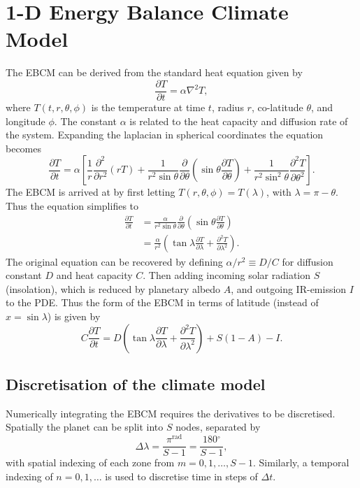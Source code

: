 \documentclass[12pt, onecolumn]{revtex4-2}    %
\newcommand{\radians}{\ensuremath{^{\text{rad}}}}
\newcommand{\degrees}{\ensuremath{^{\circ}}}
\newcommand{\partialderiv}[2]{\frac{\partial {#1}}{\partial {#2}}}
\newcommand{\partialderivsecnd}[2]{\frac{\partial^2 {#1}}{\partial {#2}^2}}
\begin{document}
\section{1-D Energy Balance Climate Model}\label{sec:1DEBCM}
The EBCM can be derived from the standard heat equation given by
\begin{equation}
  \partialderiv{T}{t} = \alpha \nabla^2 T,
\end{equation}
where $T(t, r, \theta, \phi)$ is the temperature at time $t$, radius $r$, co-latitude $\theta$, and longitude $\phi$.
The constant $\alpha$ is related to the heat capacity and diffusion rate of the system.
Expanding the laplacian in spherical coordinates the equation becomes
\begin{equation}
  \partialderiv{T}{t} = \alpha \left[\frac{1}{r} \partialderivsecnd{}{r} (r T)
    + \frac{1}{r^2 \sin\theta} \partialderiv{}{\theta}\left(\sin\theta \partialderiv{T}{\theta}\right)
    + \frac{1}{r^2 \sin^2\theta} \partialderivsecnd{T}{\theta} \right]. \label{eq:FullyExpandedHeatEqn}
\end{equation}
The EBCM is arrived at by first letting $T(r, \theta, \phi) = T(\lambda)$, with $\lambda = \pi - \theta$. Thus the equation simplifies to
\begin{align}
  \partialderiv{T}{t} & = \frac{\alpha}{r^2 \sin\theta} \partialderiv{}{\theta}\left(\sin\theta \partialderiv{T}{\theta}\right)   \\
                      & = \frac{\alpha}{r^2} \left(\tan\lambda \partialderiv{T}{\lambda} + \partialderivsecnd{T}{\lambda}\right).
\end{align}
The original equation can be recovered by defining $\alpha / r^2 \equiv D / C$ for diffusion constant $D$ and heat capacity $C$.
Then adding incoming solar radiation $S$ (insolation), which is reduced by planetary albedo $A$, and outgoing IR-emission $I$ to the PDE.
Thus the form of the EBCM in terms of latitude (instead of $x = \sin\lambda$) is given by
\begin{equation}
  C\partialderiv{T}{t} = D \left(\tan\lambda \partialderiv{T}{\lambda} + \partialderivsecnd{T}{\lambda}\right) + S(1-A) - I.
\end{equation}

\subsection{Discretisation of the climate model} \label{ssec:DiscretisationPDE}
Numerically integrating the EBCM requires the derivatives to be discretised.
Spatially the planet can be split into $S$ nodes, separated by
\begin{equation}
  \Delta\lambda = \frac{\pi\radians}{S-1} = \frac{180\degrees}{S-1},
\end{equation}
with spatial indexing of each zone from $m=0, 1, \dots, S-1$.
Similarly, a temporal indexing of $n=0, 1, \dots$ is used to discretise time in steps of $\Delta t$.
\end{document}
